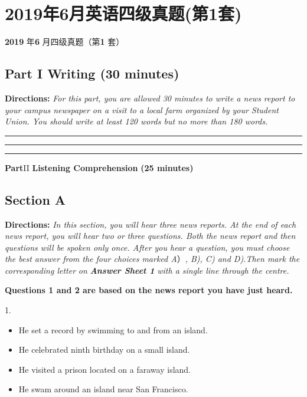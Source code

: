 \documentclass[UTF8,11pt]{ctexart}
\begin{document}
\section*{2019年6月英语四级真题(第1套)}
\textbf{2019} 年\textbf{6} 月四级真题（第\textbf{1} 套）


\subsection*{\textbf{Part I} \textbf{Writing} \textbf{(30 minutes)}}


\textbf{Directions:}\textit{ For this part, you are allowed 30 minutes to write a news report to your campus newspaper on a visit} \textit{to a local farm organized by your Student Union. You should write at least 120 words but no more than 180 words.} \par\noindent\rule{.95\linewidth}{.4pt}\par  \par\noindent\rule{.95\linewidth}{.4pt}\par  \par\noindent\rule{.95\linewidth}{.4pt}\par  \textbf{Part}II \textbf{Listening Comprehension} \textbf{(25 minutes)}


\subsection*{\textbf{Section A}}


\textbf{Directions:}\textit{ In this section, you will hear three news reports. At the end of each news report, you will hear two or} \textit{three questions. Both the news report and then questions will be spoken only once. After you hear a question, you} \textit{must choose the best answer from the four choices marked A}）\textit{, B), C) and D).Then mark the corresponding letter} \textit{on}\textbf{\textit{ Answer Sheet 1}}\textit{ with a single line through the centre.}


\textbf{Questions 1 and 2 are based on the news report you have just heard.}


1.


\begin{itemize}[leftmargin=2em,itemsep=.2em,topsep=.4em]\item[A.] He set a record by swimming to and from an island.
\item[B.] He celebrated ninth birthday on a small island.
\item[C.] He visited a prison located on a faraway island.
\item[D.] He swam around an island near San Francisco.
\end{itemize}
\end{document}
